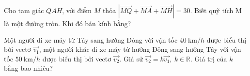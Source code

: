 \begin{ex}%
	Cho tam giác $QAH$, với điểm $M$ thỏa $\left|\overrightarrow{MQ}+\overrightarrow{MA}+\overrightarrow{MH}\right|=30$. Biết quỹ tích M là một đường tròn. Khi đó bán kính bằng?
	\par{}
\end{ex}
\begin{ex}%
	Một người đi xe máy từ Tây sang hướng Đông với vận tốc $40\mathrm{~km}/h$ được biểu thị bởi vectơ $\overrightarrow{v_1}$, một người khác đi xe máy từ hướng Đông sang hướng Tây với vận tốc $50\mathrm{~km}/h$ được biểu thị bởi vectơ $\overrightarrow{v_2}$.
	Giả sử $\overrightarrow{v_2}= k \overrightarrow{v_1},\ k \in \mathbb{R}$. Giá trị của $k$ bằng bao nhiêu?
	\par{}
\end{ex}
